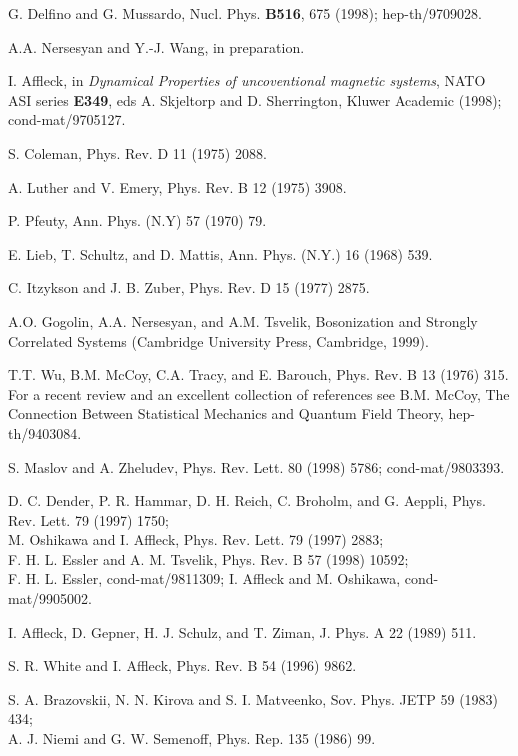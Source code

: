 \begin{thebibliography}{99}

 G. Delfino and G. Mussardo, 
Nucl. Phys. {\bf B516}, 675 (1998);
hep-th/9709028.

 A.A. Nersesyan and Y.-J. Wang, in preparation.

I. Affleck, in {\sl Dynamical Properties of uncoventional 
magnetic systems}, NATO ASI series {\bf E349}, eds A. Skjeltorp and
D. Sherrington, Kluwer Academic (1998);
cond-mat/9705127.

 S. Coleman, Phys. Rev. D 11 (1975)
2088.

 A. Luther and V. Emery, Phys. Rev. B 12 (1975)
3908.

 P. Pfeuty, 
Ann. Phys. (N.Y) 57 (1970) 79.

 E. Lieb, T. Schultz, and D. Mattis,
Ann. Phys. (N.Y.) 16 (1968) 539.

 C. Itzykson and J. B. Zuber, Phys. Rev. D 15 (1977)
2875.

 A.O. Gogolin, A.A. Nersesyan, and
A.M. Tsvelik, Bosonization and Strongly
Correlated Systems (Cambridge University Press,
Cambridge, 1999).

 T.T. Wu, B.M. McCoy, C.A. Tracy,
and E. Barouch, Phys. Rev. B 13 (1976) 315.
For a recent review
and an excellent collection of references
see B.M. McCoy, The Connection Between
Statistical Mechanics and Quantum Field Theory,
hep-th/9403084.

 S. Maslov and A. Zheludev, Phys. Rev. Lett.
80 (1998) 5786; cond-mat/9803393.

 D. C. Dender, P. R. Hammar, D. H. Reich, C. Broholm,
and G. Aeppli, Phys. Rev. Lett. 79 (1997) 1750;\\
M. Oshikawa and I. Affleck, Phys. Rev. Lett. 79 (1997) 2883;\\
F. H. L. Essler and A. M. Tsvelik, Phys. Rev. B 57 (1998) 10592;\\
F. H. L. Essler, cond-mat/9811309;
I. Affleck and M. Oshikawa, cond-mat/9905002.

 I. Affleck, D. Gepner, H. J. Schulz, and
T. Ziman, J. Phys. A 22 (1989) 511.

S. R. White and I. Affleck, Phys. Rev. B 54 (1996) 9862.

 S. A. Brazovskii, N. N. Kirova and S. I. Matveenko,
Sov. Phys. JETP 59 (1983) 434;\\
A. J. Niemi and G. W. Semenoff, Phys. Rep. 135 (1986) 99.


\end{thebibliography}
